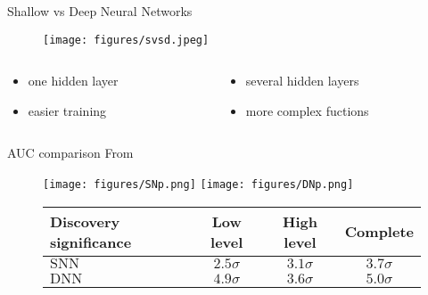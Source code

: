 \documentclass{beamer}
\begin{document}
\begin{frame}{Shallow vs Deep Neural Networks}
 \begin{figure}[h]
  \centering
  \texttt{[image: figures/svsd.jpeg]}
 \end{figure}
 \begin{columns}
  \begin{column}{0.5\textwidth}
   \begin{itemize}
    \item one hidden layer
    \item easier training
   \end{itemize}
  \end{column}
  \begin{column}{0.5\textwidth}  %
   \begin{itemize}
    \item several hidden layers
    \item more complex fuctions
   \end{itemize}
  \end{column}
 \end{columns}
 
\end{frame}

\begin{frame}{AUC comparison}
 \small From~\cite{paper}
 \begin{figure}
  \centering
  \texttt{[image: figures/SNp.png]} \texttt{[image: figures/DNp.png]}\\
  \vspace{0.5cm}
  \footnotesize \begin{tabular}{lccc}
   \toprule
   Discovery significance & Low level   & High level  & Complete    \\
   \midrule
   $\text{SNN}$           & $2.5\sigma$ & $3.1\sigma$ & $3.7\sigma$ \\
   $\text{DNN}$           & $4.9\sigma$ & $3.6\sigma$ & $5.0\sigma$ \\
   \bottomrule
  \end{tabular}
 \end{figure}
\end{frame}
\end{document}
